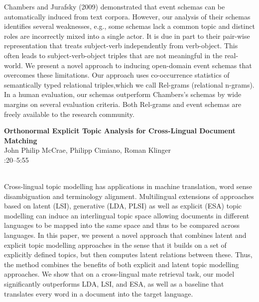 \documentclass[twoside,makeidx]{book}
\renewcommand{\normalsize}{\fontsize{8}{9}\selectfont}
\renewcommand{\small}{\fontsize{7}{8}\selectfont}
\begin{document}
\nopagebreak%
\noindent%
{\small Chambers and Jurafsky (2009) demonstrated that event schemas can be automatically induced from text corpora. However, our analysis of their schemas identifies several weaknesses, e.g., some schemas lack a common topic and distinct roles are incorrectly mixed into a single actor. It is due in part to their pair-wise representation that treats subject-verb independently from verb-object. This often leads to subject-verb-object triples that are not meaningful in the real-world.  We present a novel approach to inducing open-domain event schemas that overcomes these limitations. Our approach uses co-occurrence statistics of semantically typed relational triples,which we call Rel-grams (relational n-grams). In a human evaluation, our schemas outperform Chambers's schemas by wide margins on several evaluation criteria.  Both Rel-grams and event schemas are freely available to the research community.}
\par\vspace{2em}\noindent%
\begin{minipage}{\linewidth}%
\begin{center}
\textbf{\normalsize Orthonormal Explicit Topic Analysis for Cross-Lingual Document Matching}\\
\normalsize  John Philip McCrae,  Philipp Cimiano,  Roman Klinger\\
{\small 5:20--5:55}\\
\end{center}
\end{minipage}\\[0.5em]
\nopagebreak%
\noindent%
{\small Cross-lingual topic modelling has applications in machine translation, word sense disambiguation and terminology alignment. Multilingual extensions of approaches based on latent (LSI), generative (LDA, PLSI) as well as explicit (ESA) topic modelling can induce an interlingual topic space allowing documents in different languages to be mapped into the same space and thus to be compared across languages. In this paper, we present a novel approach that combines latent and explicit topic modelling approaches in the sense that it builds on a set of explicitly defined topics, but then computes latent relations between these. Thus, the method combines the benefits of both explicit and latent topic modelling approaches. We show that on a cross-lingual mate retrieval task, our model significantly outperforms LDA, LSI, and ESA, as well as a baseline that translates every word in a document into the target language.}
\clearpage
\end{document}
